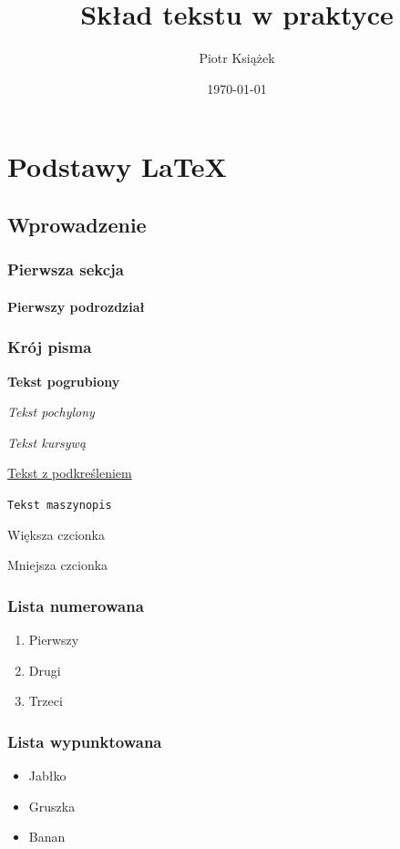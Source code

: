 \documentclass[12pt,twoside]{book}
\title{Skład tekstu w praktyce}
\author{Piotr Książek}
\date{\today}
\begin{document}
\maketitle
\tableofcontents
\listoffigures
\listoftables

\part{Podstawy LaTeX}

\chapter{Wprowadzenie}
\section{Pierwsza sekcja}
\lipsum[1]
\subsection{Pierwszy podrozdział}
\lipsum[2]

\section{Krój pisma}

\textbf{Tekst pogrubiony}

\textsl{Tekst pochylony}

\textit{Tekst kursywą}

\underline{Tekst z podkreśleniem}

\verb!Tekst maszynopis!

{\Large Większa czcionka}

{\small Mniejsza czcionka}

\section{Lista numerowana}
\begin{enumerate}
\item Pierwszy
\item Drugi
\item Trzeci
\end{enumerate}

\section{Lista wypunktowana}
\begin{itemize}
\item Jabłko
\item Gruszka
\item Banan
\end{itemize}
\end{document}
